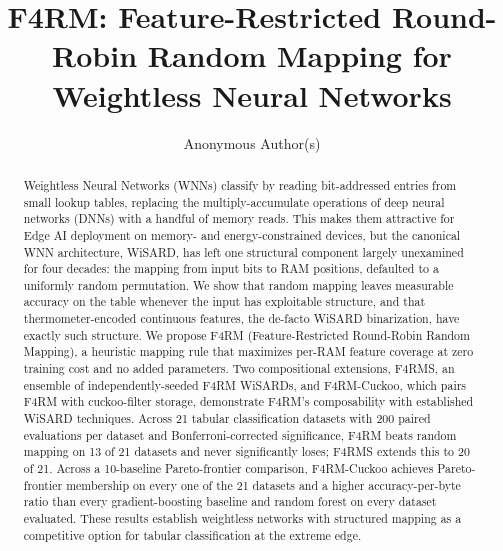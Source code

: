 \documentclass[runningheads]{llncs}
\begin{document}

\title{F4RM: Feature-Restricted Round-Robin Random Mapping for Weightless Neural Networks}


\author{Anonymous Author(s)}



\maketitle

\begin{abstract}
Weightless Neural Networks (WNNs) classify by reading bit-addressed entries from small lookup tables, replacing the multiply-accumulate operations of deep neural networks (DNNs) with a handful of memory reads. This makes them attractive for Edge AI deployment on memory- and energy-constrained devices, but the canonical WNN architecture, WiSARD, has left one structural component largely unexamined for four decades: the mapping from input bits to RAM positions, defaulted to a uniformly random permutation. We show that random mapping leaves measurable accuracy on the table whenever the input has exploitable structure, and that thermometer-encoded continuous features, the de-facto WiSARD binarization, have exactly such structure. We propose F4RM (Feature-Restricted Round-Robin Random Mapping), a heuristic mapping rule that maximizes per-RAM feature coverage at zero training cost and no added parameters. Two compositional extensions, F4RMS, an ensemble of independently-seeded F4RM WiSARDs, and F4RM-Cuckoo, which pairs F4RM with cuckoo-filter storage, demonstrate F4RM's composability with established WiSARD techniques. Across 21 tabular classification datasets with 200 paired evaluations per dataset and Bonferroni-corrected significance, F4RM beats random mapping on 13 of 21 datasets and never significantly loses; F4RMS extends this to 20 of 21. Across a 10-baseline Pareto-frontier comparison, F4RM-Cuckoo achieves Pareto-frontier membership on every one of the 21 datasets and a higher accuracy-per-byte ratio than every gradient-boosting baseline and random forest on every dataset evaluated. These results establish weightless networks with structured mapping as a competitive option for tabular classification at the extreme edge.

\end{abstract}
\end{document}
